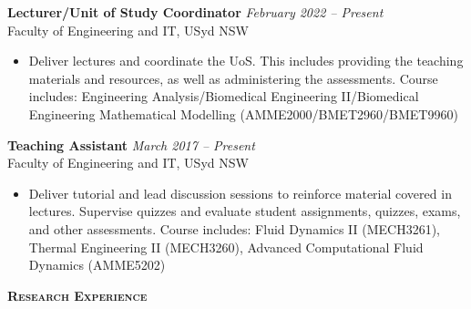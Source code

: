 \documentclass[letterpaper, 10pt]{article}
\newenvironment{changemargin}[2]{%
  \begin{list}{}{%
      \setlength{\topsep}{0pt}%
      \setlength{\leftmargin}{#1}%
      \setlength{\rightmargin}{#2}%
      \setlength{\listparindent}{\parindent}%
      \setlength{\itemindent}{\parindent}%
      \setlength{\parsep}{\parskip}%
    }%
  \item[]}{\end{list}
}
\newcommand{\lineover}{
  \begin{changemargin}{-0.05in}{-0.05in}
    \vspace*{-8pt}
    \hrulefill \\
    \vspace*{-2pt}
  \end{changemargin}
}
\newcommand{\header}[1]{
  \begin{changemargin}{-0.5in}{-0.5in}
    \textbf{\scshape{#1}}\\
    \lineover
  \end{changemargin}
}
\newenvironment{body} {
  \vspace*{-16pt}
  \begin{changemargin}{-0.25in}{-0.5in}
  }
  {\end{changemargin}
}
\begin{document}
\begin{body}
	\vspace{14pt}
	\textbf{Lecturer/Unit of Study Coordinator} \hfill \emph{February 2022 -- Present}\\
Faculty of Engineering and IT, USyd \hfill NSW
\vspace{-2pt}
\begin{itemize}
	\setlength{\itemindent}{0in}
	\setlength{\itemsep}{0in}
	\item Deliver lectures and coordinate the UoS. This includes providing the teaching materials and resources, as well as administering the assessments.
	Course includes: Engineering Analysis/Biomedical Engineering II/Biomedical Engineering Mathematical Modelling (AMME2000/BMET2960/BMET9960)
\end{itemize}

\smallskip

	\textbf{Teaching Assistant} \hfill \emph{March 2017 -- Present}\\
Faculty of Engineering and IT, USyd \hfill NSW
\vspace{-2pt}
\begin{itemize}
	\setlength{\itemindent}{0in}
	\setlength{\itemsep}{0in}
	\item Deliver tutorial and lead discussion sessions to reinforce material covered in
	lectures. Supervise quizzes and evaluate student assignments, quizzes, exams, and other assessments.
	Course includes: Fluid Dynamics II (MECH3261), Thermal Engineering II (MECH3260), Advanced Computational Fluid Dynamics (AMME5202)
\end{itemize}
\end{body}
\smallskip
\header{Research Experience}
\end{document}
